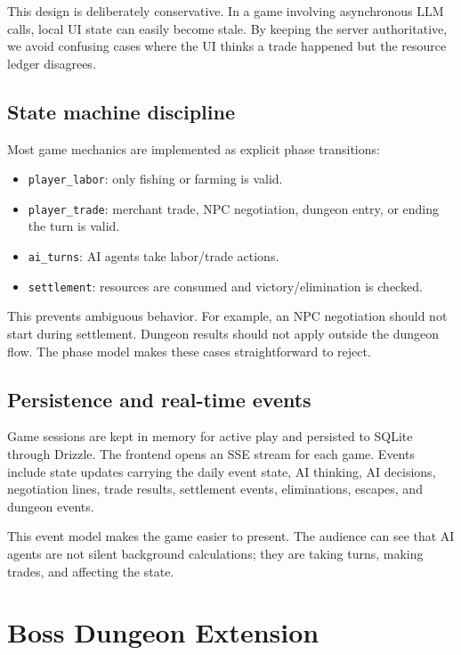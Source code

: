 \documentclass[11pt]{article}
\begin{document}
This design is deliberately conservative. In a game involving asynchronous LLM
calls, local UI state can easily become stale. By keeping the server
authoritative, we avoid confusing cases where the UI thinks a trade happened but
the resource ledger disagrees.

\subsection{State machine discipline}

Most game mechanics are implemented as explicit phase transitions:

\begin{itemize}
  \item \texttt{player\_labor}: only fishing or farming is valid.
  \item \texttt{player\_trade}: merchant trade, NPC negotiation, dungeon entry,
  or ending the turn is valid.
  \item \texttt{ai\_turns}: AI agents take labor/trade actions.
  \item \texttt{settlement}: resources are consumed and victory/elimination is
  checked.
\end{itemize}

This prevents ambiguous behavior. For example, an NPC negotiation should not
start during settlement. Dungeon results should not apply outside the dungeon
flow. The phase model makes these cases straightforward to reject.

\subsection{Persistence and real-time events}

Game sessions are kept in memory for active play and persisted to SQLite through
Drizzle. The frontend opens an SSE stream for each game. Events include state
updates carrying the daily event state, AI thinking, AI decisions, negotiation
lines, trade results, settlement events, eliminations, escapes, and dungeon
events.

This event model makes the game easier to present. The audience can see that AI
agents are not silent background calculations; they are taking turns, making
trades, and affecting the state.

\section{Boss Dungeon Extension}
\end{document}
